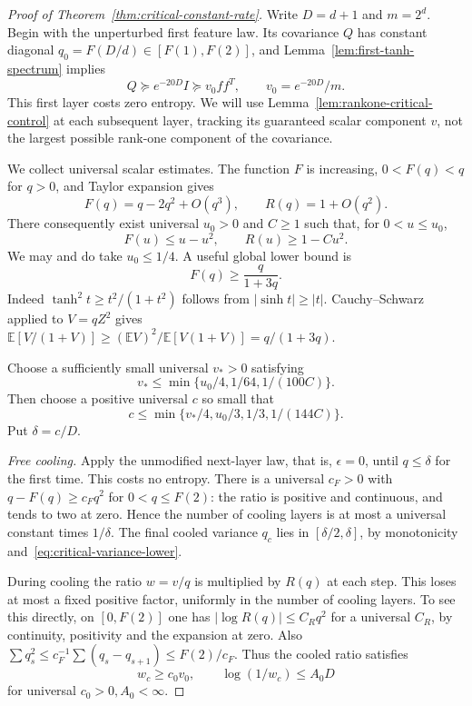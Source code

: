 \begin{proof}[Proof of Theorem~\ref{thm:critical-constant-rate}]
Write $D=d+1$ and $m=2^d$. Begin with the unperturbed first feature law.
Its covariance $Q$ has constant diagonal
$q_0=F(D/d)\in[F(1),F(2)]$, and
Lemma~\ref{lem:first-tanh-spectrum} implies
\[
 Q\succeq e^{-20D}I\succeq v_0ff^T,
 \qquad v_0=e^{-20D}/m.
\]
This first layer costs zero entropy. We will use
Lemma~\ref{lem:rankone-critical-control} at each subsequent layer,
tracking its guaranteed scalar component $v$, not the largest possible
rank-one component of the covariance.

We collect universal scalar estimates. The function $F$ is increasing,
$0<F(q)<q$ for $q>0$, and Taylor expansion gives
\[
 F(q)=q-2q^2+O(q^3),\qquad R(q)=1+O(q^2).
\]
There consequently exist universal $u_0>0$ and $C\ge1$ such that,
for $0<u\le u_0$,
\begin{equation}\label{eq:critical-local-estimates}
 F(u)\le u-u^2,\qquad R(u)\ge1-Cu^2.
\end{equation}
We may and do take $u_0\le1/4$.
A useful global lower bound is
\begin{equation}\label{eq:critical-variance-lower}
 F(q)\ge\frac q{1+3q}.
\end{equation}
Indeed $\tanh^2 t\ge t^2/(1+t^2)$ follows from $|\sinh t|\ge|t|$.
Cauchy--Schwarz applied to $V=qZ^2$ gives
$\mathbb E[V/(1+V)]\ge(\mathbb EV)^2/\mathbb E[V(1+V)]
=q/(1+3q)$.

Choose a sufficiently small universal $v_*>0$ satisfying
\[
 v_*\le\min\{u_0/4,1/64,1/(100C)\}.
\]
Then choose a positive universal $c$ so small that
\[
 c\le\min\{v_*/4,u_0/3,1/3,1/(144C)\}.
\]
Put $\delta=c/D$.

\emph{Free cooling.}
Apply the unmodified next-layer law, that is, $\epsilon=0$, until
$q\le\delta$ for the first time. This costs no entropy.
There is a universal $c_F>0$ with
$q-F(q)\ge c_Fq^2$ for $0<q\le F(2)$: the ratio is positive and
continuous, and tends to two at zero. Hence the number of cooling
layers is at most a universal constant times $1/\delta$.
The final cooled variance $q_c$ lies in $[\delta/2,\delta]$, by
monotonicity and~\eqref{eq:critical-variance-lower}.

During cooling the ratio $w=v/q$ is multiplied by $R(q)$ at each step.
This loses at most a fixed positive factor, uniformly in the number
of cooling layers. To see this directly, on $[0,F(2)]$ one has
$|\log R(q)|\le C_R q^2$ for a universal $C_R$, by continuity,
positivity and the expansion at zero. Also
$\sum q_s^2\le c_F^{-1}\sum(q_s-q_{s+1})\le F(2)/c_F$.
Thus the cooled ratio satisfies
\[
 w_c\ge c_0v_0,
 \qquad \log(1/w_c)\le A_0D
\]
for universal $c_0>0,A_0<\infty$.


\end{proof}
